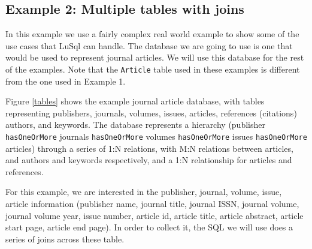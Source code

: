 

\subsection[Example 2]{Example 2: Multiple tables with joins}
\label{example2}
In this example we use a fairly complex real world example to show some of the
use cases that LuSql can handle.
The database we are going to use is one that would be used to represent
journal articles.
We will use this database for the rest of the examples.
Note that the {\tt Article} table used in these examples is different from the
one used in Example 1.

Figure \ref{tables} shows the example journal article database, with tables
representing publishers, journals, volumes, issues, articles, references
(citations) authors, and keywords. 
The database represents a hierarchy (publisher {\tt hasOneOrMore} journals
{\tt hasOneOrMore} volumes {\tt hasOneOrMore} issues {\tt hasOneOrMore}
 articles) through a series of 1:N relations,
with M:N relations between articles, and authors and keywords respectively,
and a 1:N relationship for articles and references.

For this example, we are interested in the publisher, journal, volume, issue,
article information (publisher name, journal title, journal ISSN, journal
volume, journal volume year, issue number, article id, article title, article
abstract, article start page, article end page).
In order to collect it, the SQL we will use does a series of joins across
these table.

